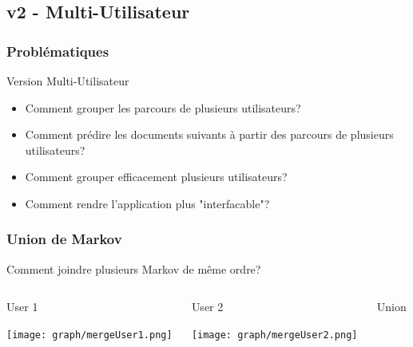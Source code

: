 \documentclass{beamer}
\begin{document}
        \subsection{v2 - Multi-Utilisateur}
        \begin{frame}
        \frametitle{Problématiques}
        Version Multi-Utilisateur
        \pause
        \begin{itemize}
        \item Comment grouper les parcours de plusieurs utilisateurs?
        \pause
        \item Comment prédire les documents suivants à partir des parcours de plusieurs utilisateurs?
        \pause
        \item Comment grouper efficacement plusieurs utilisateurs?
        \pause
        \item Comment rendre l'application plus "interfacable"?
        \end{itemize}
        \end{frame}
        \begin{frame}
        \frametitle{Union de Markov}
        Comment joindre plusieurs Markov de même ordre?
        \pause[2]
        \begin{columns}[t]
        \begin{column}{3cm}
        \begin{exampleblock}{User 1}
        \begin{center}
        \texttt{[image: graph/mergeUser1.png]}
        \end{center}
        \end{exampleblock}
        \end{column}
        \begin{column}{3cm}
        \begin{exampleblock}{User 2}
        \begin{center}
        \texttt{[image: graph/mergeUser2.png]}
        \end{center}
        \end{exampleblock}
        \end{column}
        \pause[3]
        \begin{column}{3cm}
        \begin{exampleblock}{Union}
        \begin{center}
        \pause[4]
        \end{center}
        \end{exampleblock}
        \end{column}
        \end{columns}
        \end{frame}
\end{document}
